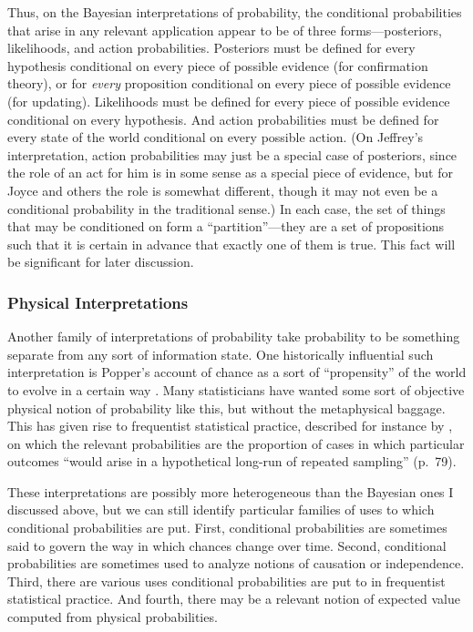 Thus, on the Bayesian interpretations of probability, the conditional probabilities that arise in any relevant application appear to be of three forms---posteriors, likelihoods, and action probabilities. Posteriors must be defined for every hypothesis conditional on every piece of possible evidence (for confirmation theory), or for \emph{every} proposition conditional on every piece of possible evidence (for updating). Likelihoods must be defined for every piece of possible evidence conditional on every hypothesis. And action probabilities must be defined for every state of the world conditional on every possible action. (On Jeffrey's interpretation, action probabilities may just be a special case of posteriors, since the role of an act for him is in some sense as a special piece of evidence, but for Joyce and others the role is somewhat different, though it may not even be a conditional probability in the traditional sense.) In each case, the set of things that may be conditioned on form a ``partition''---they are a set of propositions such that it is certain in advance that exactly one of them is true. This fact will be significant for later discussion.

\subsubsection{Physical Interpretations}

Another family of interpretations of probability take probability to be something separate from any sort of information state. One historically influential such interpretation is Popper's account of chance as a sort of ``propensity'' of the world to evolve in a certain way \citep{propensity}. Many statisticians have wanted some sort of objective physical notion of probability like this, but without the metaphysical baggage. This has given rise to frequentist statistical practice, described for instance by \citet{mayocox}, on which the relevant probabilities are the proportion of cases in which particular outcomes ``would arise in a hypothetical long-run of repeated sampling'' (p.\ 79).

These interpretations are possibly more heterogeneous than the Bayesian ones I discussed above, but we can still identify particular families of uses to which conditional probabilities are put. First, conditional probabilities are sometimes said to govern the way in which chances change over time. Second, conditional probabilities are sometimes used to analyze notions of causation or independence. Third, there are various uses conditional probabilities are put to in frequentist statistical practice. And fourth, there may be a relevant notion of expected value computed from physical probabilities.


